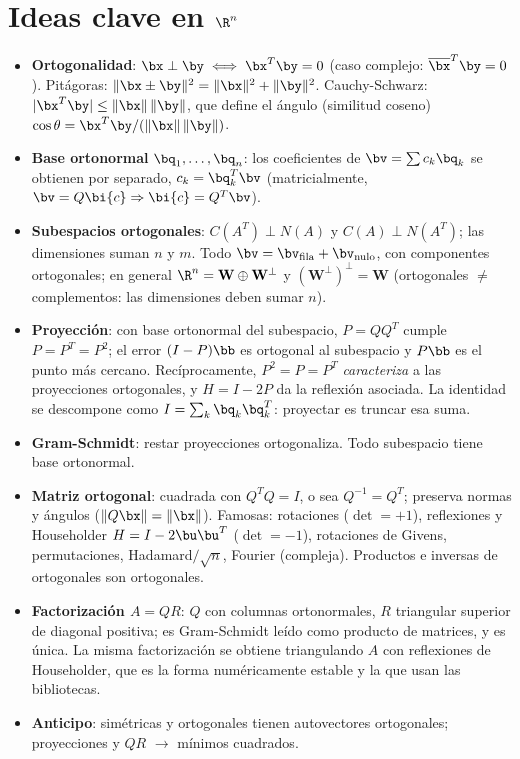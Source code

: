 \section*{Ideas clave en $\R^n$}
\begin{ideas}
\begin{itemize}[leftmargin=*]
\item \textbf{Ortogonalidad}: $\bx\perp\by\iff\bx^T\by=0$ (caso
complejo: $\overline{\bx}^T\by=0$). Pitágoras:
$\|\bx\pm\by\|^2=\|\bx\|^2+\|\by\|^2$. Cauchy-Schwarz:
$|\bx^T\by|\le\|\bx\|\,\|\by\|$, que define el ángulo (similitud
coseno) $\cos\theta=\bx^T\by/(\|\bx\|\,\|\by\|)$.
\item \textbf{Base ortonormal} $\bq_1,\dots,\bq_n$: los coeficientes de
$\bv=\sum c_k\bq_k$ se obtienen por separado, $c_k=\bq_k^T\bv$
(matricialmente, $\bv=Q\bi{c}\Rightarrow\bi{c}=Q^T\bv$).
\item \textbf{Subespacios ortogonales}: $C(A^T)\perp N(A)$ y
$C(A)\perp N(A^T)$; las dimensiones suman $n$ y $m$. Todo
$\bv=\bv_{\text{fila}}+\bv_{\text{nulo}}$, con componentes ortogonales; en
general $\R^n=\mathbf{W}\oplus\mathbf{W}^{\perp}$ y
$(\mathbf{W}^{\perp})^{\perp}=\mathbf{W}$ (ortogonales $\ne$
complementos: las dimensiones deben sumar $n$).
\item \textbf{Proyección}: con base ortonormal del subespacio,
$P=QQ^T$ cumple $P=P^T=P^2$; el error $(I-P)\bb$ es ortogonal al
subespacio y $P\bb$ es el punto más cercano. Recíprocamente,
$P^2=P=P^T$ \emph{caracteriza} a las proyecciones ortogonales, y
$H=I-2P$ da la reflexión asociada. La identidad se descompone como
$I=\sum_k\bq_k\bq_k^T$: proyectar es truncar esa suma.
\item \textbf{Gram-Schmidt}: restar proyecciones ortogonaliza. Todo
subespacio tiene base ortonormal.
\item \textbf{Matriz ortogonal}: cuadrada con $Q^T Q=I$, o sea
$Q^{-1}=Q^T$; preserva normas y ángulos ($\|Q\bx\|=\|\bx\|$). Famosas:
rotaciones ($\det=+1$), reflexiones y Householder $H=I-2\bu\bu^T$
($\det=-1$), rotaciones de Givens, permutaciones, Hadamard$/\sqrt n$,
Fourier (compleja).
Productos e inversas de ortogonales son ortogonales.
\item \textbf{Factorización $A=QR$}: $Q$ con columnas ortonormales, $R$
triangular superior de diagonal positiva; es Gram-Schmidt leído como
producto de matrices, y es única. La misma factorización se obtiene
triangulando $A$ con reflexiones de Householder, que es la forma
numéricamente estable y la que usan las bibliotecas.
\item \textbf{Anticipo}: simétricas y ortogonales tienen autovectores
ortogonales; proyecciones y $QR$ $\to$ mínimos cuadrados.
\end{itemize}
\end{ideas}


